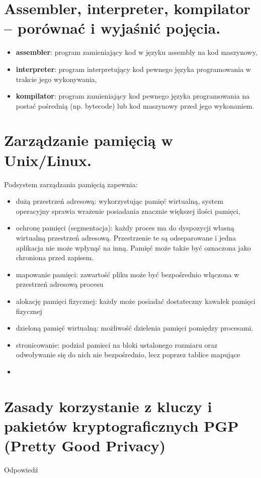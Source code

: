 \documentclass[12pt,a4paper]{article}
\begin{document}
	\section{Assembler, interpreter, kompilator – porównać i wyjaśnić pojęcia.}
	\begin{itemize}	
		\item \textbf{assembler}: program zamieniający kod w języku assembly na kod maszynowy,
		\item \textbf{interpreter}: program interpretujący kod pewnego języka programowania w trakcie jego wykonywania,
		\item \textbf{kompilator}: program zamieniający kod pewnego języka programowania na postać pośrednią (np. bytecode) lub kod maszynowy przed jego wykonaniem.
	\end{itemize}	

	\section{Zarządzanie pamięcią w Unix/Linux.}
	Podsystem zarządzania pamięcią zapewnia:
	\begin{itemize}
		\item 	dużą przestrzeń adresową: wykorzystując pamięć wirtualną, system operacyjny sprawia wrażenie posiadania znacznie większej ilości pamięci,
		\item ochronę pamięci (segmentacja): każdy proces ma do dyspozycji własną wirtualną przestrzeń adresową. Przestrzenie te są odseparowane i jedna aplikacja nie może wpłynąć na inną. Pamięć może także być oznaczona jako chroniona przed zapisem.
		\item mapowanie pamięci: zawartość pliku może być bezpośrednio włączona w przestrzeń adresową procesu
		\item alokację pamięci fizycznej: każdy może posiadać dostateczny kawałek pamięci fizycznej
		\item dzieloną pamięć wirtualną: możliwość dzielenia pamięci pomiędzy procesami.
		\item stronicowanie: podział pamieci na bloki ustalonego rozmiaru oraz odwoływanie się do nich nie bezpośrednio, lecz poprzez tablice mapujące
		\item 
	\end{itemize}

	\section{Zasady korzystanie z kluczy i pakietów kryptograficznych PGP (Pretty Good Privacy)}
	Odpowiedź
\end{document}
